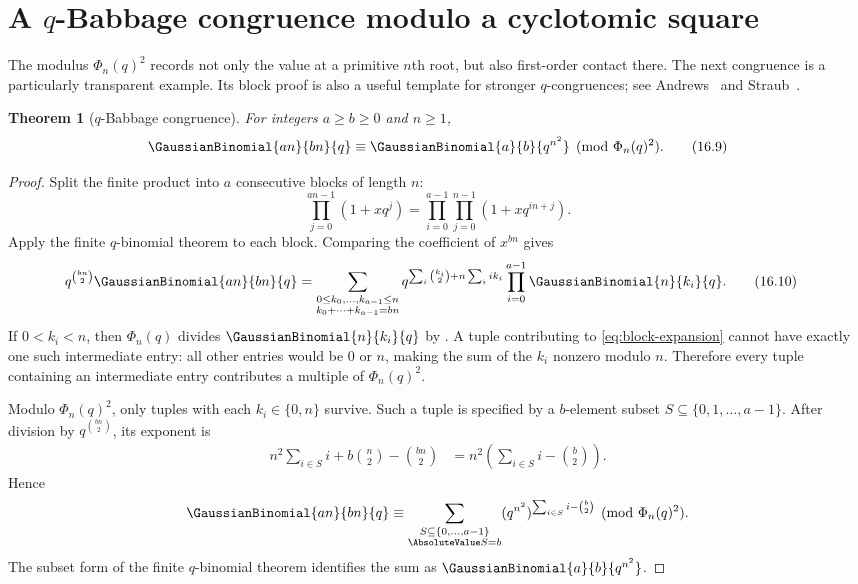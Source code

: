 \documentclass[11pt,a4paper,oneside,openany]{book}
\newtheorem{theorem}{Theorem}[chapter]
\theoremstyle{definition}
\theoremstyle{remark}
\begin{document}
\section{A \texorpdfstring{$q$}{q}-Babbage congruence modulo a cyclotomic square}

The modulus $\Phi_n(q)^2$ records not only the value at a primitive $n$th root, but also first-order contact there.  The next congruence is a particularly transparent example.  Its block proof is also a useful template for stronger $q$-congruences; see Andrews~\cite{Andrews1999Congruences} and Straub~\cite{Straub2011Ljunggren}.

\begin{theorem}[$q$-Babbage congruence]\label{thm:q-babbage}
For integers $a\ge b\ge0$ and $n\ge1$,
\[
 \GaussianBinomial{an}{bn}{q}
 \equiv
 \GaussianBinomial{a}{b}{q^{n^2}}
 \pmod{\Phi_n(q)^2}.
 \tag{16.9}\label{eq:q-babbage}
\]
\end{theorem}

\begin{proof}
Split the finite product into $a$ consecutive blocks of length $n$:
\[
 \prod_{j=0}^{an-1}(1+xq^j)
 =\prod_{i=0}^{a-1}\prod_{j=0}^{n-1}(1+xq^{in+j}).
\]
Apply the finite $q$-binomial theorem to each block.  Comparing the coefficient of $x^{bn}$ gives
\begin{align}
 q^{\binom{bn}{2}}\GaussianBinomial{an}{bn}{q}
 &=\sum_{\substack{0\le k_0,\ldots,k_{a-1}\le n\\
                    k_0+\cdots+k_{a-1}=bn}}
 q^{\sum_i\binom{k_i}{2}+n\sum_i i k_i}
 \prod_{i=0}^{a-1}\GaussianBinomial{n}{k_i}{q}.
 \tag{16.10}\label{eq:block-expansion}
\end{align}
If $0<k_i<n$, then $\Phi_n(q)$ divides $\GaussianBinomial{n}{k_i}{q}$ by .  A tuple contributing to \eqref{eq:block-expansion} cannot have exactly one such intermediate entry: all other entries would be $0$ or $n$, making the sum of the $k_i$ nonzero modulo $n$.  Therefore every tuple containing an intermediate entry contributes a multiple of $\Phi_n(q)^2$.

Modulo $\Phi_n(q)^2$, only tuples with each $k_i\in\{0,n\}$ survive.  Such a tuple is specified by a $b$-element subset $S\subseteq\{0,1,\ldots,a-1\}$.  After division by $q^{\binom{bn}{2}}$, its exponent is
\begin{align*}
 n^2\sum_{i\in S}i+b\binom n2-\binom{bn}{2}
 &=n^2\left(\sum_{i\in S}i-\binom b2\right).
\end{align*}
Hence
\[
 \GaussianBinomial{an}{bn}{q}
 \equiv
 \sum_{\substack{S\subseteq\{0,\ldots,a-1\}\\\AbsoluteValue S=b}}
 (q^{n^2})^{\sum_{i\in S}i-\binom b2}
 \pmod{\Phi_n(q)^2}.
\]
The subset form of the finite $q$-binomial theorem identifies the sum as $\GaussianBinomial{a}{b}{q^{n^2}}$.
\end{proof}
\end{document}
